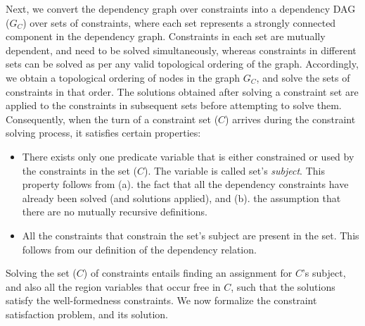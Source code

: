 Next, we convert the dependency graph over constraints into a
dependency DAG ($G_C$) over sets of constraints, where each set
represents a strongly connected component in the dependency graph.
Constraints in each set are mutually dependent, and need to be solved
simultaneously, whereas constraints in different sets can be solved as
per any valid topological ordering of the graph. Accordingly, we
obtain a topological ordering of nodes in the graph $G_{{C}}$, and
solve the sets of constraints in that order. The solutions obtained
after solving a constraint set are applied to the constraints in
subsequent sets before attempting to solve them. Consequently, when
the turn of a constraint set ($C$) arrives during the constraint solving
process, it satisfies certain properties:
\begin{itemize}
\item There exists only one predicate variable that is either
constrained or used by the constraints in the set ($C$). The variable is
called set's \emph{subject}. This property follows from (a). the fact
that all the dependency constraints have already been solved (and
solutions applied), and (b). the assumption that there are no mutually
recursive definitions. 
\item All the constraints that constrain the set's subject are present
in the set. This follows from our definition of the dependency relation.
\end{itemize}

Solving the set ($C$) of constraints entails finding an assignment for
$C$'s subject, and also all the region variables that occur free in
$C$, such that the solutions satisfy the well-formedness constraints.
We now formalize the constraint satisfaction problem, and its
solution.

